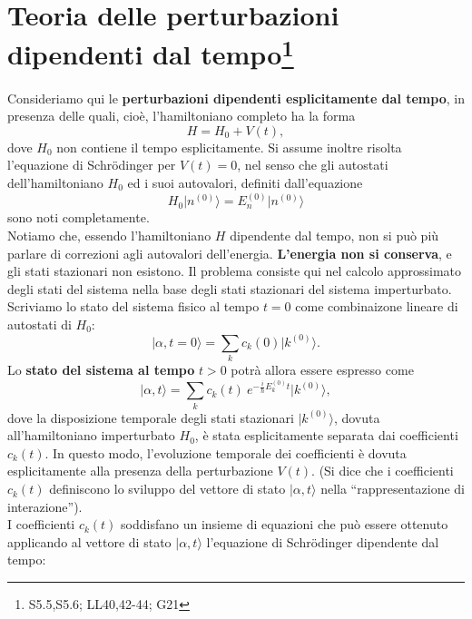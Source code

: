 \chapter[T.d.P. dipendenti dal tempo]{Teoria delle perturbazioni dipendenti dal tempo\footnote{ S5.5,S5.6; LL40,42-44; G21}}
Consideriamo qui le \textbf{perturbazioni dipendenti esplicitamente dal tempo}, in presenza delle quali, cioè, l'hamiltoniano completo ha la forma
\begin{equation}
H=H_0+V(t),
\end{equation}
dove $H_0$ non contiene il tempo esplicitamente. Si assume inoltre risolta l'equazione di Schr\"{o}dinger per $V(t)=0$, nel senso che gli autostati dell'hamiltoniano $H_0$ ed i suoi autovalori, definiti dall'equazione
\begin{equation}
H_0 \vert n ^{(0)} \rangle = E_n ^{(0)} \vert n ^{(0)} \rangle 
\end{equation}
sono noti completamente.\\
Notiamo che, essendo l'hamiltoniano $H$ dipendente dal tempo, non si può più parlare di correzioni agli autovalori dell'energia. \textbf{L'energia non si conserva}, e gli stati stazionari non esistono. Il problema consiste qui nel calcolo approssimato degli stati del sistema nella base degli stati stazionari del sistema imperturbato.\\
Scriviamo lo stato del sistema fisico al tempo $t=0$ come combinaizone lineare di autostati di $H_0$:
\begin{equation}
\vert \alpha ,t=0  \rangle = \sum _k c_k (0) \vert k ^{(0)} \rangle .
\label{eq:cap15_1}
\end{equation}
Lo \textbf{stato del sistema al tempo} $t>0$ potrà allora essere espresso come
\begin{equation}
\vert \alpha ,t  \rangle = \sum _k c_k (t)\ e^{-\frac{i}{\hbar}E_k ^{(0)} t } \vert k ^{(0)} \rangle ,
\label{eq:cap15_2}
\end{equation}
dove la disposizione temporale degli stati stazionari $\vert k ^{(0)} \rangle$, dovuta all'hamiltoniano imperturbato $H_0$, è stata esplicitamente separata dai coefficienti $c_k {(t)}$. In questo modo, l'evoluzione temporale dei coefficienti è dovuta esplicitamente alla presenza della perturbazione $V(t)$. (Si dice che i coefficienti $c_k (t)$ definiscono lo sviluppo del vettore di stato $\vert \alpha , t \rangle $ nella ``rappresentazione di interazione'').\\
I coefficienti $c_k (t)$ soddisfano un insieme di equazioni che può essere ottenuto applicando al vettore di stato $\vert \alpha , t \rangle $ l'equazione di Schr\"{o}dinger dipendente dal tempo:
